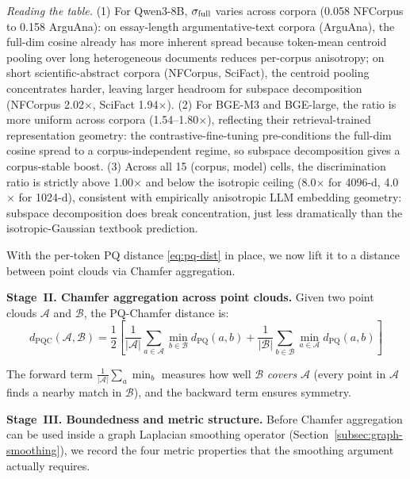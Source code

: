 \documentclass[review,1p]{elsarticle}
\begin{document}
\begin{table}[ht]
\vspace{4pt}
{\footnotesize
\textit{Reading the table.} (1) For Qwen3-8B, $\sigma_{\rm full}$ varies across corpora (0.058 NFCorpus to 0.158 ArguAna): on essay-length argumentative-text corpora (ArguAna), the full-dim cosine already has more inherent spread because token-mean centroid pooling over long heterogeneous documents reduces per-corpus anisotropy; on short scientific-abstract corpora (NFCorpus, SciFact), the centroid pooling concentrates harder, leaving larger headroom for subspace decomposition (NFCorpus 2.02$\times$, SciFact 1.94$\times$). (2) For BGE-M3 and BGE-large, the ratio is more uniform across corpora (1.54--1.80$\times$), reflecting their retrieval-trained representation geometry: the contrastive-fine-tuning pre-conditions the full-dim cosine spread to a corpus-independent regime, so subspace decomposition gives a corpus-stable boost. (3) Across all 15 (corpus, model) cells, the discrimination ratio is strictly above 1.00$\times$ and below the isotropic ceiling (8.0$\times$ for 4096-d, 4.0$\times$ for 1024-d), consistent with empirically anisotropic LLM embedding geometry: subspace decomposition does break concentration, just less dramatically than the isotropic-Gaussian textbook prediction.
}
\end{table}



With the per-token PQ distance \eqref{eq:pq-dist} in place, we now lift it to a distance between point clouds via Chamfer aggregation.

\textbf{Stage~II. Chamfer aggregation across point clouds.} Given two point clouds $\mathcal{A}$ and $\mathcal{B}$, the PQ-Chamfer distance is:
\begin{equation}
\label{eq:chamfer}
d_{\mathrm{PQC}}(\mathcal{A}, \mathcal{B}) = \frac{1}{2} \left[ \frac{1}{|\mathcal{A}|} \sum_{a \in \mathcal{A}} \min_{b \in \mathcal{B}} d_{\mathrm{PQ}}(a, b) + \frac{1}{|\mathcal{B}|} \sum_{b \in \mathcal{B}} \min_{a \in \mathcal{A}} d_{\mathrm{PQ}}(a, b) \right]
\end{equation}

The forward term $\frac{1}{|\mathcal{A}|}\sum_a \min_b$ measures how well $\mathcal{B}$ \textit{covers} $\mathcal{A}$ (every point in $\mathcal{A}$ finds a nearby match in $\mathcal{B}$), and the backward term ensures symmetry.

\textbf{Stage~III. Boundedness and metric structure.} Before Chamfer aggregation can be used inside a graph Laplacian smoothing operator (Section~\ref{subsec:graph-smoothing}), we record the four metric properties that the smoothing argument actually requires.
\end{document}
